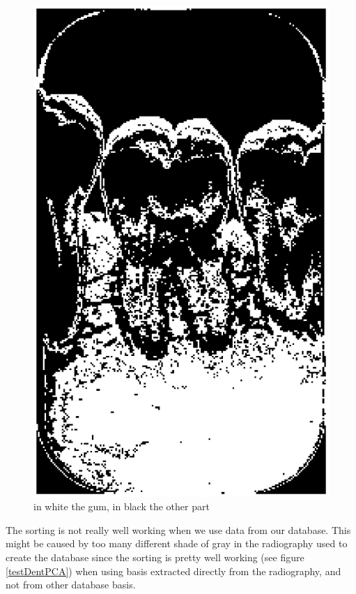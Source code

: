 \begin{figure}[H]
\centering
\includegraphics[scale=0.3]{images/recTextrx1.eps}
\caption{in white the gum, in black the other part}
\label{recText}
\end{figure}
The sorting is not really well working when we use data from our database. This might be caused by too many different shade of gray in the radiography used to create the database since the sorting is pretty well working (see figure \ref{testDentPCA}) when using basis extracted directly from the radiography, and not from other database basis. 
